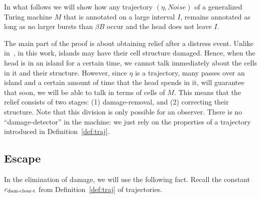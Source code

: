 \documentclass[12pt]{memoir}
\def\B{B}
\newcommand{\Noise}{\mathit{Noise}}
\newcommand{\cns}[1]{c_{\textrm{\upshape #1}}}
\newcommand{\cDamClearT}{\cns{dam-clear-t}}
\begin{document}
 In what follows we will show how any trajectory \( (\eta, \Noise) \) 
 of a generalized Turing machine \( M \) 
 that is annotated on a large interval \( I \), remains annotated
 as long as no larger bursts than \( \beta\B \) occur and the
 head does not leave \( I \).

 The main part of the proof is about obtaining relief  after a distress event.
 Unlike in~\cite{burstyTuring13}, in this work, islands 
 may have their cell structure damaged.
 Hence, when the head is in an island for a certain
 time, we cannot talk immediately about the cells in it
 and their structure.
 However, since \( \eta \) is a trajectory,
 many passes over an island and a certain amount of time
 that the head spends in it, will guarantee that
 soon, we will be able to talk in terms of cells of \( M \).
 This means that the relief consists of two stages: (1)
 damage-removal, and (2) correcting their structure.
Note that this division is only possible for an observer.
There is no ``damage-detector'' in the machine:
we just rely on the properties of a 
trajectory introduced in Definition~\ref{def:traj}.


\subsection{Escape}

In the elimination of damage, we will use the following fact.
Recall the constant \( \cDamClearT \) from Definition~\ref{def:traj}
of trajectories.
\end{document}
